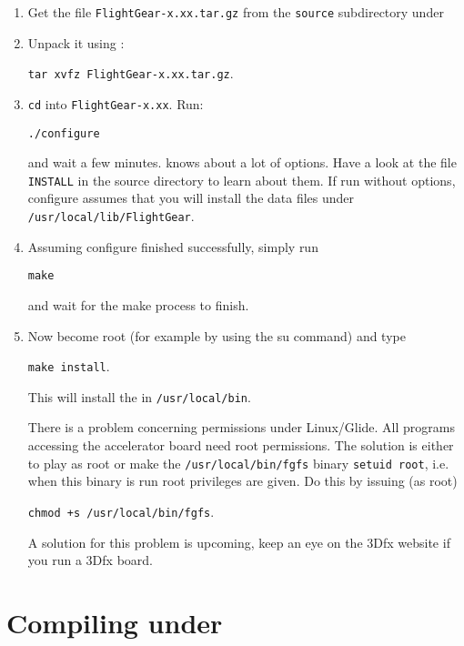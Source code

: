 \begin{enumerate}

\item Get the file \texttt{FlightGear-x.xx.tar.gz} from the
\texttt{source} subdirectory under


 \noindent

\item Unpack it using :

        \texttt{tar xvfz FlightGear-x.xx.tar.gz}.

\item \texttt{cd} into \texttt{FlightGear-x.xx}. Run:

        \texttt{./configure}

 \noindent
and wait a few minutes.  knows about a lot of
options. Have a look at the file \texttt{INSTALL} in the
\FlightGear source directory to learn about them. If run without
options, configure assumes that you will install the data files
under \texttt{/usr/local/lib/FlightGear}.


\item Assuming configure finished successfully, simply run

        \texttt{make}

 \noindent
and wait for the make process to finish.


\item Now become root (for example by using the su command) and
type

        \texttt{make install}.

 \noindent
This will install the  in \texttt{/usr/local/bin}.

There is a problem concerning permissions under Linux/Glide. All
programs accessing the accelerator board need root permissions.
The solution is either to play as root or make the
\texttt{/usr/local/bin/fgfs} binary \texttt{setuid root}, i.e.
when this binary is run root privileges are given. Do this by
issuing (as root)

   \texttt{chmod +s /usr/local/bin/fgfs}.

 \noindent
A solution for this problem is upcoming, keep an eye on the 3Dfx
website if you run a 3Dfx board.

\end{enumerate}

\section{Compiling under }

